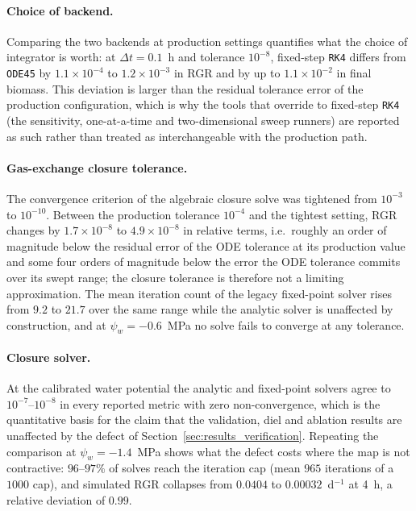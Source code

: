 \documentclass[a4paper,fleqn]{cas-sc}
\begin{document}
\paragraph{Choice of backend.}
Comparing the two backends at production settings quantifies what the choice of
integrator is worth: at $\Delta t = 0.1$~h and tolerance $10^{-8}$, fixed-step
\texttt{RK4} differs from \texttt{ODE45} by $1.1\times10^{-4}$ to
$1.2\times10^{-3}$ in RGR and by up to $1.1\times10^{-2}$ in final biomass.
This deviation is larger than the residual tolerance error of the production
configuration, which is why the tools that override to fixed-step \texttt{RK4}
(the sensitivity, one-at-a-time and two-dimensional sweep runners) are reported
as such rather than treated as interchangeable with the production path.

\paragraph{Gas-exchange closure tolerance.}
The convergence criterion of the algebraic closure solve was tightened from
$10^{-3}$ to $10^{-10}$. Between the production tolerance $10^{-4}$ and the
tightest setting, RGR changes by $1.7\times10^{-8}$ to $4.9\times10^{-8}$ in
relative terms, i.e.\ roughly an order of magnitude below the residual error of
the ODE tolerance at its production value and some four orders of magnitude
below the error the ODE tolerance commits over its swept range; the closure
tolerance is therefore not a limiting approximation. The mean iteration count
of the legacy fixed-point solver rises from $9.2$ to $21.7$ over the same range
while the analytic solver is unaffected by construction, and at
$\psi_w = -0.6$~MPa no solve fails to converge at any tolerance.

\paragraph{Closure solver.}
At the calibrated water potential the analytic and fixed-point solvers agree to
$10^{-7}$--$10^{-8}$ in every reported metric with zero non-convergence, which
is the quantitative basis for the claim that the validation, diel and ablation
results are unaffected by the defect of Section~\ref{sec:results_verification}.
Repeating the comparison at $\psi_w = -1.4$~MPa shows what the defect costs
where the map is not contractive: $96$--$97\%$ of solves reach the iteration cap
(mean $965$ iterations of a $1000$ cap), and simulated RGR collapses from
$0.0404$ to $0.00032$~d$^{-1}$ at 4~h, a relative deviation of $0.99$.
\end{document}
